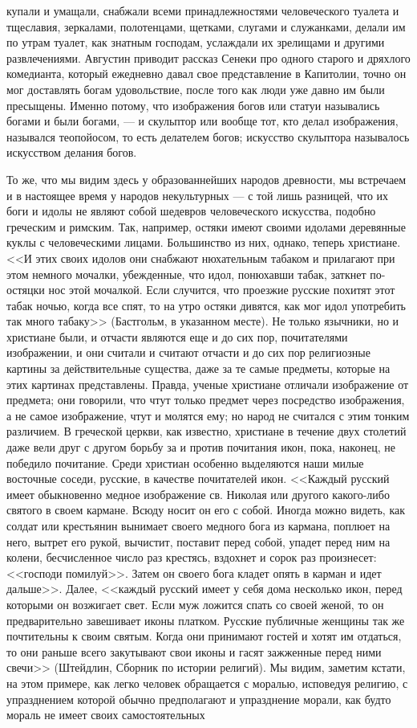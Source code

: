 \documentclass[12pt]{article}
\begin{document}
купали и умащали, снабжали всеми принадлежностями человеческого туалета и тщеславия, зеркалами, полотенцами, щетками, слугами и служанками, делали им по утрам туалет, как знатным господам, услаждали их зрелищами и другими развлечениями. Августин приводит рассказ Сенеки про одного старого и дряхлого комедианта, который ежедневно давал свое представление в Капитолии, точно он мог доставлять богам удовольствие, после того как люди уже давно им были пресыщены. Именно потому, что изображения богов или статуи назывались богами и были богами, --- и скульптор или вообще тот, кто делал изображения, назывался теопойосом, то есть делателем богов; искусство скульптора называлось искусством делания богов. 

То же, что мы видим здесь у образованнейших народов древности, мы встречаем и в настоящее время у народов некультурных --- с той лишь разницей, что их боги и идолы не являют собой шедевров человеческого искусства, подобно греческим и римским. Так, например, остяки имеют своими идолами деревянные куклы с человеческими лицами. Большинство из них, однако, теперь христиане. <<И этих своих идолов они снабжают нюхательным табаком и прилагают при этом немного мочалки, убежденные, что идол, понюхавши табак, заткнет по-остяцки нос этой мочалкой. Если случится, что проезжие русские похитят этот табак ночью, когда все спят, то на утро остяки дивятся, как мог идол употребить так много табаку>> (Бастгольм, в указанном месте). Не только язычники, но и христиане были, и отчасти являются еще и до сих пор, почитателями изображении, и они считали и считают отчасти и до сих пор религиозные картины за действительные существа, даже за те самые предметы, которые на этих картинах представлены. Правда, ученые христиане отличали изображение от предмета; они говорили, что чтут только предмет через посредство изображения, а не самое изображение, чтут и молятся ему; но народ не считался с этим тонким различием. В греческой церкви, как известно, христиане в течение двух столетий даже вели друг с другом борьбу за и против почитания икон, пока, наконец, не победило почитание. Среди христиан особенно выделяются наши милые восточные соседи, русские, в качестве почитателей икон. <<Каждый русский имеет обыкновенно медное изображение св. Николая или другого какого-либо святого в своем кармане. Всюду носит он его с собой. Иногда можно видеть, как солдат или крестьянин вынимает своего медного бога из кармана, поплюет на него, вытрет его рукой, вычистит, поставит перед собой, упадет перед ним на колени, бесчисленное число раз крестясь, вздохнет и сорок раз произнесет: <<господи помилуй>>. Затем он своего бога кладет опять в карман и идет дальше>>. Далее, <<каждый русский имеет у себя дома несколько икон, перед которыми он возжигает свет. Если муж ложится спать со своей женой, то он предварительно завешивает иконы платком. Русские публичные женщины так же почтительны к своим святым. Когда они принимают гостей и хотят им отдаться, то они раньше всего закутывают свои иконы и гасят зажженные перед ними свечи>> (Штейдлин, Сборник по истории религий). Мы видим, заметим кстати, на этом примере, как легко человек обращается с моралью, исповедуя религию, с упразднением которой обычно предполагают и упразднение морали, как будто мораль не имеет своих самостоятельных 
\end{document}
